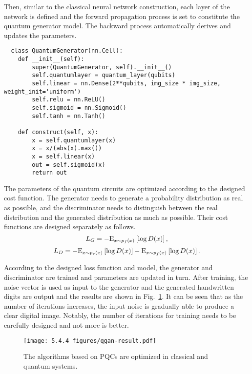 Then, similar to the classical neural network construction, each layer of the network is defined and the forward propagation process is set to constitute the quantum generator model. The backward process automatically derives and updates the parameters.
\begin{lstlisting}
  class QuantumGenerator(nn.Cell):
    def __init__(self):
        super(QuantumGenerator, self).__init__()
        self.quantumlayer = quantum_layer(qubits)
        self.linear = nn.Dense(2**qubits, img_size * img_size, weight_init='uniform')
        self.relu = nn.ReLU()
        self.sigmoid = nn.Sigmoid()
        self.tanh = nn.Tanh()

    def construct(self, x):
        x = self.quantumlayer(x)
        x = x/(abs(x).max())
        x = self.linear(x)
        out = self.sigmoid(x)
        return out
\end{lstlisting}

The parameters of the quantum circuits are optimized according to the designed cost function. The generator needs to generate a probability distribution as real as possible, and the discriminator needs to distinguish between the real distribution and the generated distribution as much as possible. Their cost functions are designed separately as follows.
\begin{equation}
  {L_G} =  - {{\rm E}_{x\sim{p_f}(x)}}\left[ {\log D(x)} \right],
\end{equation}
\begin{equation}
  {L_D} =  - {{\rm E}_{x\sim{p_r}(x)}}\left[ {\log D(x)} \right] - {{\rm E}_{x\sim{p_f}(x)}}\left[ {\log D(x)} \right].
\end{equation}

According to the designed loss function and model, the generator and discriminator are trained and parameters are updated in turn. After training, the noise vector is used as input to the generator and the generated handwritten digits are output and the results are shown in Fig.~\ref{qgan-result}. It can be seen that as the number of iterations increases, the input noise is gradually able to produce a clear digital image. Notably, the number of iterations for training needs to be carefully designed and not more is better.
\begin{figure}[htbp]
  \centering
  \texttt{[image: 5.4.4\_figures/qgan-result.pdf]}
  \caption{\label{qgan-result} The algorithms based on PQCs are optimized in classical and quantum systems.}
\end{figure}